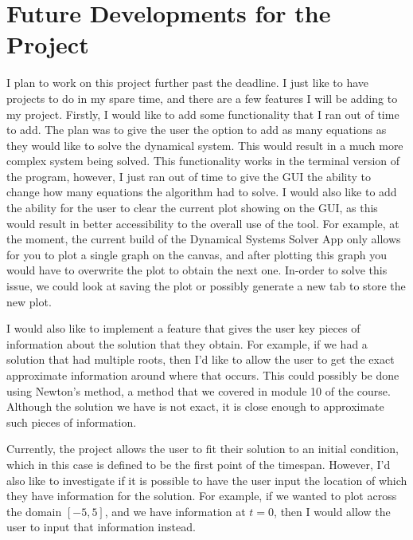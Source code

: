 \documentclass[12pt]{report}
\begin{document}
\section{Future Developments for the Project}
I plan to work on this project further past the deadline. I just like to have projects to do in my spare time, and there are a few features I will be adding to my project. Firstly, I would like to add some functionality that I ran out of time to add. The plan was to give the user the option to add as many equations as they would like to solve the dynamical system. This would result in a much more complex system being solved. This functionality works in the terminal version of the program, however, I just ran out of time to give the GUI the ability to change how many equations the algorithm had to solve. I would also like to add the ability for the user to clear the current plot showing on the GUI, as this would result in better accessibility to the overall use of the tool. For example, at the moment, the current build of the Dynamical Systems Solver App only allows for you to plot a single graph on the canvas, and after plotting this graph you would have to overwrite the plot to obtain the next one. In-order to solve this issue, we could look at saving the plot or possibly generate a new tab to store the new plot.
\smallskip

I would also like to implement a feature that gives the user key pieces of information about the solution that they obtain. For example, if we had a solution that had multiple roots, then I'd like to allow the user to get the exact approximate information around where that occurs. This could possibly be done using Newton's method, a method that we covered in module 10 of the course. Although the solution we have is not exact, it is close enough to approximate such pieces of information.
\smallskip

Currently, the project allows the user to fit their solution to an initial condition, which in this case is defined to be the first point of the timespan. However, I'd also like to investigate if it is possible to have the user input the location of which they have information for the solution. For example, if we wanted to plot across the domain $[-5,5]$, and we have information at $t = 0$, then I would allow the user to input that information instead.
\end{document}
